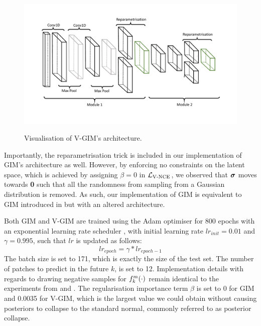 		\begin{figure}
			\centering
			\hspace*{1.5cm}
			\begin{annotatedFigure}
				{\includegraphics[width=0.8\linewidth, trim={0 2.8cm 0 2cm}, clip]{"graphs/vgim architecture"} }
				
				
				
				
			\end{annotatedFigure}
			\caption{Visualisation of V-GIM's architecture.}
			\label{fig:architecture}
		\end{figure}
		
		
		Importantly, the reparametrisation trick is included in our implementation of GIM's architecture as well. However, by enforcing no constraints on the latent space, which is achieved by assigning $\beta = 0$ in $\mathcal{L}_{\text{V-NCE}}$, we observed that $\bm{\sigma}$ moves towards \textbf{0} such that all the randomness from sampling from a Gaussian distribution is removed. As such, our implementation of GIM is equivalent to GIM introduced in \citep{lowePuttingEndEndtoEnd2020} but with an altered architecture.
		
		Both GIM and V-GIM are trained using the Adam optimiser for 800 epochs with an exponential learning rate scheduler \citep{bhargavladGuidePytorchLearning2020}, with initial learning rate $lr_{init} = 0.01$ and $\gamma=0.995$, such that $lr$ is updated as follows:
		$$lr_{epoch} = \gamma * lr_{epoch - 1}$$
		The batch size is set to 171, which is exactly the size of the test set. The number of patches to predict in the future $k$, is set to 12. Implementation details with regards to drawing negative samples for $f_k^m(\cdot)$ remain identical to the experiments from \citep{oordRepresentationLearningContrastive2019} and \citep{lowePuttingEndEndtoEnd2020}. The regularisation importance term $\beta$ is set to 0 for GIM and 0.0035 for V-GIM, which is the largest value we could obtain without causing posteriors to collapse to the standard normal, commonly referred to as posterior collapse.

